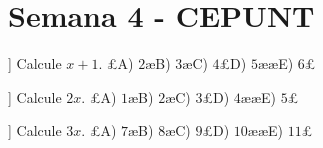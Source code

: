 ﻿\section*{Semana 4 - CEPUNT}
\item[\textbf{1.}] [[Clave=A]] Calcule $x+1$. £A) $2$æB) $3$æC) $4$£D) $5$ææE) $6$£
\item[\textbf{2.}] [[Clave=C]] Calcule $2x$. £A) $1$æB) $2$æC) $3$£D) $4$ææE) $5$£
\item[\textbf{3.}] [[Clave=E]] Calcule $3x$. £A) $7$æB) $8$æC) $9$£D) $10$ææE) $11$£
